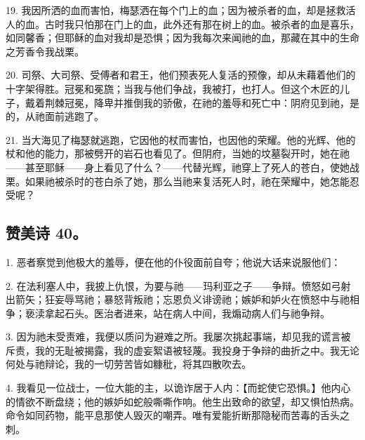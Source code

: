 19. 我因所洒的血而害怕，梅瑟洒在每个门上的血；因为被杀者的血，却是拯救活人的血。古时我只怕那在门上的血，此外还有那在树上的血。被杀者的血是喜乐，如同馨香；但耶稣的血对我却是恐惧；因为我每次来闻祂的血，那藏在其中的生命之芳香令我战栗。\par

20. 司祭、大司祭、受傅者和君王，他们预表死人复活的预像，却从未藉着他们的十字架得胜。冠冕和冕旒；当我与他们争战，我被打，也打人。但这个木匠的儿子，戴着荆棘冠冕，降卑并推倒我的骄傲，在祂的羞辱和死亡中：阴府见到祂，是的，从祂面前逃跑了。\par

21. 当大海见了梅瑟就逃跑，它因他的杖而害怕，也因他的荣耀。他的光辉、他的杖和他的能力，那被劈开的岩石也看见了。但阴府，当她的坟墓裂开时，她在祂——甚至耶稣——身上看见了什么？——代替光辉，祂穿上了死人的苍白，使她战栗。如果祂被杀时的苍白杀了她，那么当祂来复活死人时，祂在荣耀中，她怎能忍受呢？\par


\subsection{赞美诗 40。}

1. 恶者察觉到他极大的羞辱，便在他的仆役面前自夸；他说大话来说服他们：\newline{}\par

2. 在法利塞人中，我披上仇恨，为要与祂——玛利亚之子——争辩。愤怒如弓射出箭矢；狂妄辱骂祂；暴怒背叛祂；忘恩负义诽谤祂；嫉妒和妒火在愤怒中与祂相争；亵渎拿起石头。医治者进来，站在病人中间，我煽动病人们与祂争辩。\par

3. 因为祂未受责难，我便以质问为避难之所。我屡次挑起事端，却见我的谎言被斥责，我的无耻被揭露，我的虚妄絮语被轻蔑。我投身于争辩的曲折之中。我无论何处与祂辩论，我的一切劳苦皆如糠秕，将其四散吹去。\par

4. 我看见一位战士，一位大能的主，以诡诈居于人内：【而蛇使它恐惧。】他内心的情欲不断盘绕；他的嫉妒如蛇般嘶嘶作响。他生出致命的欲望，却又惧怕热病。命令如同药物，能平息那使人毁灭的嘲弄。唯有爱能折断那隐秘而苦毒的舌头之刺。\par

